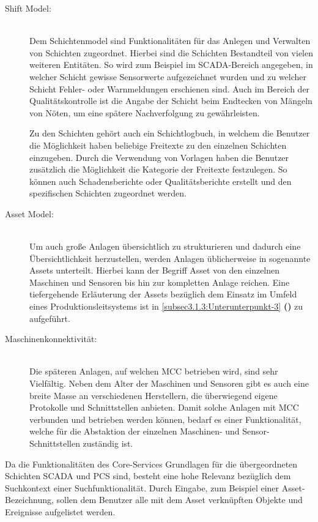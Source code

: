 \begin{description}

    \item[Shift Model:]\hfill \\
    Dem Schichtenmodel sind Funktionalitäten für das Anlegen und Verwalten von Schichten zugeordnet. Hierbei sind die Schichten Bestandteil von vielen weiteren Entitäten. So wird zum Beispiel im SCADA-Bereich angegeben, in welcher Schicht gewisse Sensorwerte aufgezeichnet wurden und zu welcher Schicht Fehler- oder Warnmeldungen erschienen sind. Auch im Bereich der Qualitätskontrolle ist die Angabe der Schicht beim Endtecken von Mängeln von Nöten, um eine spätere Nachverfolgung zu gewährleisten.

    Zu den Schichten gehört auch ein Schichtlogbuch, in welchem die Benutzer die Möglichkeit haben beliebige Freitexte zu den einzelnen Schichten einzugeben. Durch die Verwendung von Vorlagen haben die Benutzer zusätzlich die Möglichkeit die Kategorie der Freitexte festzulegen. So können auch Schadensberichte oder Qualitätsberichte erstellt und den spezifischen Schichten zugeordnet werden.

    \item[Asset Model:]\hfill \\
    Um auch große Anlagen übersichtlich zu strukturieren und dadurch eine Übersichtlichkeit herzustellen, werden Anlagen üblicherweise in sogenannte \glqq Assets\grqq{} unterteilt. Hierbei kann der Begriff \glqq Asset\grqq{} von den einzelnen Maschinen und Sensoren bis hin zur kompletten Anlage reichen. Eine tiefergehende Erläuterung der \glqq Assets\grqq{} bezüglich dem Einsatz im Umfeld eines Produktionsleitsystems ist in \autoref{subsec3.1.3:Unterunterpunkt-3} \textbf{()} zu aufgeführt.
    
    \item[Maschinenkonnektivität:]\hfill \\
    Die späteren Anlagen, auf welchen MCC betrieben wird, sind sehr Vielfältig. Neben dem Alter der Maschinen und Sensoren gibt es auch eine breite Masse an verschiedenen Herstellern, die überwiegend eigene Protokolle und Schnittstellen anbieten. Damit solche Anlagen mit MCC verbunden und betrieben werden können, bedarf es einer Funktionalität, welche für die Abstaktion der einzelnen Maschinen- und Sensor-Schnittstellen zuständig ist.

\end{description}

Da die Funktionalitäten des Core-Services Grundlagen für die übergeordneten Schichten \glqq SCADA\grqq{} und \glqq PCS\grqq{} sind, besteht eine hohe Relevanz bezüglich dem Suchkontext einer Suchfunktionalität. Durch Eingabe, zum Beispiel einer Asset-Bezeichnung, sollen dem Benutzer alle mit dem Asset verknüpften Objekte und Ereignisse aufgelistet werden.

